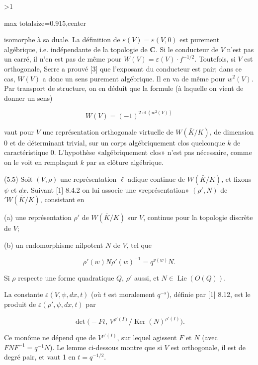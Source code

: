 \documentclass[9pt,twoside]{extarticle}
\newcommand{\EditionPage}[3]{%
  \ifnum#1>1\clearpage\fi
  \pdfbookmark[1]{Printed folio #2}{fr-folio-#2}%
  \hypertarget{fr-page-#1}{}%
  \noindent\begin{adjustbox}{max totalsize={\textwidth}{0.915\textheight},center}
  \begin{minipage}[t]{\textwidth}
  \fontsize{8.45}{10.05}\selectfont\justifying
  #3
  \end{minipage}
  \end{adjustbox}%
}
\begin{document}
\EditionPage{17}{315}{%
isomorphe à sa duale. La définition de \(\varepsilon(V)=\varepsilon(V,0)\) est purement algébrique, i.e. indépendante de la topologie de \(\mathbf C\). Si le conducteur de \(V\) n’est pas un carré, il n’en est pas de même pour \(W(V)=\varepsilon(V)\cdot f^{-1/2}\). Toutefois, si \(V\) est orthogonale, Serre a prouvé [3] que l’exposant du conducteur est pair; dans ce cas, \(W(V)\) a donc un sens purement algébrique. Il en va de même pour \(w^2(V)\). Par transport de structure, on en déduit que la formule (à laquelle on vient de donner un sens)\par

\[
\tag{5.4.1}W(V)=(-1)^{2\operatorname{cl}(w^2(V))}
\]

vaut pour \(V\) une représentation orthogonale virtuelle de \(W(\bar K/K)\), de dimension 0 et de déterminant trivial, sur un corps algébriquement clos quelconque \(k\) de caractéristique 0. L’hypothèse «algébriquement clos» n’est pas nécessaire, comme on le voit en remplaçant \(k\) par sa clôture algébrique.\par

(5.5) Soit \((V,\rho)\) une représentation \(\ell\)-adique continue de \(W(\bar K/K)\), et fixons \(\psi\) et \(dx\). Suivant [1] 8.4.2 on lui associe une «représentation» \((\rho',N)\) de \({}'W(\bar K/K)\), consistant en\par

(a) une représentation \(\rho'\) de \(W(\bar K/K)\) sur \(V\), continue pour la topologie discrète de \(V\);\par

(b) un endomorphisme nilpotent \(N\) de \(V\), tel que\par

\[
\rho'(w)N\rho'(w)^{-1}=q^{v(w)}N.
\]

Si \(\rho\) respecte une forme quadratique \(Q\), \(\rho'\) aussi, et \(N\in\operatorname{Lie}(O(Q))\).\par

La constante \(\varepsilon(V,\psi,dx,t)\) (où \(t\) est moralement \(q^{-s}\)), définie par [1] 8.12, est le produit de \(\varepsilon(\rho',\psi,dx,t)\) par\par

\[
\det\bigl(-Ft,\,V^{\rho'(I)}/\operatorname{Ker}(N)^{\rho'(I)}\bigr).
\]

Ce monôme ne dépend que de \(V^{\rho'(I)}\), sur lequel agissent \(F\) et \(N\) (avec \(FNF^{-1}=q^{-1}N\)). Le lemme ci-dessous montre que si \(V\) est orthogonale, il est de degré pair, et vaut 1 en \(t=q^{-1/2}\).\par

}
\end{document}
